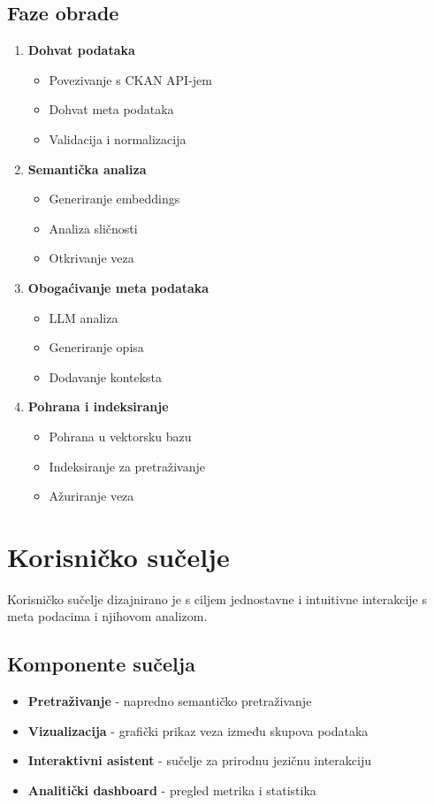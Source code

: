 \subsection{Faze obrade}
\begin{enumerate}
    \item \textbf{Dohvat podataka}
    \begin{itemize}
        \item Povezivanje s CKAN API-jem
        \item Dohvat meta podataka
        \item Validacija i normalizacija
    \end{itemize}
    
    \item \textbf{Semantička analiza}
    \begin{itemize}
        \item Generiranje embeddings
        \item Analiza sličnosti
        \item Otkrivanje veza
    \end{itemize}
    
    \item \textbf{Obogaćivanje meta podataka}
    \begin{itemize}
        \item LLM analiza
        \item Generiranje opisa
        \item Dodavanje konteksta
    \end{itemize}
    
    \item \textbf{Pohrana i indeksiranje}
    \begin{itemize}
        \item Pohrana u vektorsku bazu
        \item Indeksiranje za pretraživanje
        \item Ažuriranje veza
    \end{itemize}
\end{enumerate}

\section{Korisničko sučelje}
\label{sec:user_interface}

Korisničko sučelje dizajnirano je s ciljem jednostavne i intuitivne interakcije s 
meta podacima i njihovom analizom.

\subsection{Komponente sučelja}
\begin{itemize}
    \item \textbf{Pretraživanje} - napredno semantičko pretraživanje
    \item \textbf{Vizualizacija} - grafički prikaz veza između skupova podataka
    \item \textbf{Interaktivni asistent} - sučelje za prirodnu jezičnu interakciju
    \item \textbf{Analitički dashboard} - pregled metrika i statistika
\end{itemize}

